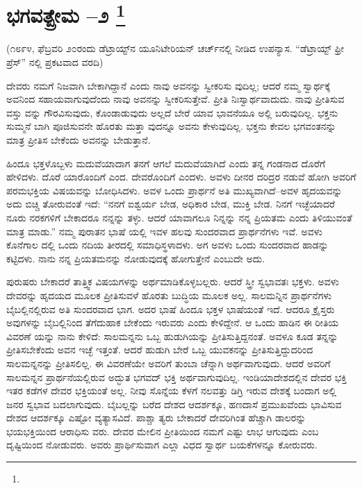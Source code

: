 
\chapter[ಭಗವತ್ಪ್ರೇಮ –೨ ]{ಭಗವತ್ಪ್ರೇಮ –೨ \protect\footnote{}}

\centerline{(೧೮೯೪, ಫೆಬ್ರವರಿ ೨೦ರಂದು ಡೆಟ್ರಾಯ್ಟ್​ನ ಯೂನಿಟೇರಿಯನ್​ ಚರ್ಚ್​ನಲ್ಲಿ ನೀಡಿದ ಉಪನ್ಯಾಸ. “ಡೆಟ್ರಾಯ್ಟ್​ ಫ್ರೀ ಪ್ರೆಸ್​” ನಲ್ಲಿ ಪ್ರಕಟವಾದ ವರದಿ)}

ದೇವರು ನಮಗೆ ನಿಜವಾಗಿ ಬೇಕಾಗಿದ್ದಾನೆ ಎಂದು ನಾವು ಅವನನ್ನು ಸ್ವೀಕರಿಸು ವುದಿಲ್ಲ; ಆದರೆ ನಮ್ಮ ಸ್ವಾರ್ಥಕ್ಕೆ ಅವನಿಂದ ಸಹಾಯವಾಗುವುದೆಂದು ನಾವು ಅವನನ್ನು ಸ್ವೀಕರಿಸುತ್ತೇವೆ. ಪ್ರೀತಿ ನಿಃಸ್ವಾರ್ಥವಾದುದು. ನಾವು ಪ್ರೀತಿಸುವ ವಸ್ತು ವನ್ನು ಗೌರವಿಸುವುದು, ಕೊಂಡಾಡುವುದು ಅಲ್ಲದೆ ಬೇರೆ ಯಾವ ಭಾವನೆಯೂ ಅಲ್ಲಿ ಬರುವುದಿಲ್ಲ. ಭಕ್ತನು ಸುಮ್ಮನೆ ಬಾಗಿ ಪೂಜಿಸುವನೇ ಹೊರತು ಮತ್ತಾ ವುದನ್ನೂ ಅವನು ಕೇಳುವುದಿಲ್ಲ. ಭಕ್ತನು ಕೇವಲ ಭಗವಂತನನ್ನು ಮಾತ್ರ ಪ್ರೀತಿಸ ಬೇಕೆಂದು ಅವನನ್ನು ಬೇಡುತ್ತಾನೆ.

ಹಿಂದೂ ಭಕ್ತಳೊಬ್ಬಳು ಮದುವೆಯಾದಾಗ ತನಗೆ ಆಗಲೆ ಮದುವೆಯಾಗಿದೆ ಎಂದು ತನ್ನ ಗಂಡನಾದ ದೊರೆಗೆ ಹೇಳಿದಳು. ದೊರೆ ಯಾರೊಂದಿಗೆ ಎಂದ. ದೇವರೊಂದಿಗೆ ಎಂದಳು. ಅವಳು ದೀನರ ದರಿದ್ರರ ನಡುವೆ ಹೋಗಿ ಅವರಿಗೆ ಪರಮಭಕ್ತಿಯ ವಿಷಯವನ್ನು ಬೋಧಿಸಿದಳು. ಅವಳ ಒಂದು ಪ್ರಾರ್ಥನೆ ಅತಿ ಮುಖ್ಯವಾಗಿದೆ–ಅವಳ ಹೃದಯವನ್ನು ಅದು ಬಿಚ್ಚಿ ತೋರುವಂತೆ ಇದೆ: “ನನಗೆ ಐಶ್ವರ್ಯ ಬೇಡ, ಅಧಿಕಾರ ಬೇಡ, ಮುಕ್ತಿ ಬೇಡ. ನಿನಗೆ ಇಚ್ಛೆಯಾದರೆ ನೂರು ನರಕಗಳಿಗೆ ಬೇಕಾದರೂ ನನ್ನನ್ನು ತಳ್ಳು. ಆದರೆ ಯಾವಾಗಲೂ ನಿನ್ನನ್ನು ನನ್ನ ಪ್ರಿಯತಮ ಎಂದು ತಿಳಿಯುವಂತೆ ಮಾತ್ರ ಮಾಡು.” ನಮ್ಮ ಪುರಾತನ ಭಾಷೆ ಯಲ್ಲಿ ಇವಳ ಹಲವು ಸುಂದರವಾದ ಪ್ರಾರ್ಥನೆಗಳು ಇವೆ. ಅವಳು ಕೊನೆಗಾಲ ದಲ್ಲಿ ಒಂದು ನದಿಯ ತೀರದಲ್ಲಿ ಸಮಾಧಿಸ್ಥಳಾದಳು. ಅಗ ಅವಳು ಒಂದು ಸುಂದರವಾದ ಹಾಡನ್ನು ಕಟ್ಟಿದಳು. ನಾನು ನನ್ನ ಪ್ರಿಯತಮನನ್ನು ನೋಡುವುದಕ್ಕೆ ಹೋಗುತ್ತೇನೆ ಎಂಬುದೇ ಅದು.

ಪುರುಷರು ಬೇಕಾದರೆ ತಾತ್ತ್ವಿಕ ವಿಷಯಗಳನ್ನು ಅರ್ಥಮಾಡಿಕೊಳ್ಳಬಲ್ಲರು. ಆದರೆ ಸ್ತ್ರೀ ಸ್ವಭಾವತಃ ಭಕ್ತಳು. ಅವಳು ದೇವರನ್ನು ಹೃದಯದ ಮೂಲಕ ಪ್ರೀತಿಸುವಳೆ ಹೊರತು ಬುದ್ಧಿಯ ಮೂಲಕ ಅಲ್ಲ. ಸಾಲಮನ್ನಿನ ಪ್ರಾರ್ಥನೆಗಳು ಬೈಬಲ್ಲಿನಲ್ಲಿರುವ ಅತಿ ಸುಂದರವಾದ ಭಾಗ. ಅದರ ಭಾಷೆ ಹಿಂದೂ ಭಕ್ತಳ ಭಾಷೆಯಂತೆ ಇದೆ. ಆದರೂ ಕ್ರೈಸ್ತರು ಅವುಗಳನ್ನು ಬೈಬಲ್ಲಿನಿಂದ ತೆಗೆದುಹಾಕ ಬೇಕೆಂದು ಇರುವರು ಎಂದು ಕೇಳಿದ್ದೇನೆ. ಆ ಒಂದು ಹಾಡಿನ ಈ ರೀತಿಯ ವಿವರಣೆ ಯನ್ನು ನಾನು ಕೇಳಿದೆ: ಸಾಲಮನ್ನನು ಒಬ್ಬ ಹುಡುಗಿಯನ್ನು ಪ್ರೀತಿಸುತ್ತಿದ್ದನಂತೆ. ಅವಳೂ ಕೂಡ ತನ್ನನ್ನು ಪ್ರೀತಿಸಬೇಕೆಂದು ಅವನ ಇಚ್ಛೆ ಇತ್ತಂತೆ. ಆದರೆ ಹುಡುಗಿ ಬೇರೆ ಒಬ್ಬ ಯುವಕನನ್ನು ಪ್ರೀತಿಸುತ್ತಿದ್ದುದರಿಂದ ಸಾಲಮನ್ನನನ್ನು ಪ್ರೀತಿಸಲಿಲ್ಲ. ಈ ವಿವರಣೆಯೇ ಅವರಿಗೆ ತುಂಬಾ ಚೆನ್ನಾಗಿ ಅರ್ಥವಾಗುವುದು. ಆದರೆ ಅವರಿಗೆ ಸಾಲಮನ್ನನ ಪ್ರಾರ್ಥನೆಯಲ್ಲಿರುವ ಅದ್ಭುತ ಭಗವದ್​ ಭಕ್ತಿ ಅರ್ಥವಾಗುವುದಿಲ್ಲ. ಇಂಡಿಯಾದೇಶದಲ್ಲಿನ ದೇವರ ಭಕ್ತಿ ಇತರ ಕಡೆಗಳ ದೇವರ ಭಕ್ತಿಯಂತೆ ಅಲ್ಲ. ನೀವು ಸೊನ್ನೆಯ ಕೆಳಗೆ ನಲವತ್ತು ಡಿಗ್ರಿ ಇರುವ ದೇಶಕ್ಕೆ ಬಂದಾಗ ಅಲ್ಲಿ ಜನರ ಸ್ವಭಾವ ಬದಲಾಗುವುದು. ಬೈಬಲ್ಲನ್ನು ಬರೆದ ದೇಶದ ಆದರ್ಶಕ್ಕೂ, ಹಣದಾಸೆ ಪ್ರಮುಖವೆಂದು ಭಾವಿಸುವ ದೇಶದ ಆದರ್ಶಕ್ಕೂ ಎಷ್ಟೋ ವ್ಯತ್ಯಾಸವಿದೆ. ಪಾಶ್ಚಾ ತ್ಯರು ಬೇಕಾದರೆ ದೇವರಿಗಿಂತ ಹೆಚ್ಚಾಗಿ ಡಾಲರನ್ನು ಭಯಭಕ್ತಿಯಿಂದ ಆರಾಧಿಸು ವರು. ದೇವರ ಮೇಲಿನ ಪ್ರೀತಿಯಿಂದ ನಮಗೆ ಎಷ್ಟು ಲಾಭ ಆಗುವುದು ಎಂಬ ದೃಷ್ಟಿಯಿಂದ ನೋಡುವರು. ಅವರು ಪ್ರಾರ್ಥಿಸುವಾಗ ಎಲ್ಲಾ ವಿಧದ ಸ್ವಾರ್ಥ ಬಯಕೆಗಳನ್ನೂ ಕೋರುವರು.

